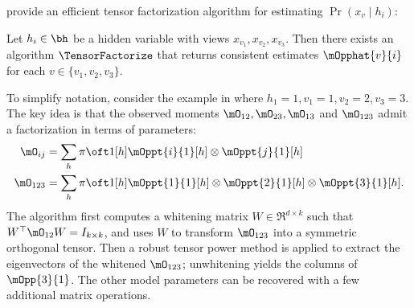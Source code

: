 
%  

\citet{anandkumar12moments} provide an efficient tensor factorization algorithm
for estimating $\Pr(x_v \mid h_i)$:
\begin{theorem}
Let $h_i \in \bh$ be a hidden variable
with views $x_{v_1},x_{v_2},x_{v_3}$.
Then there exists an algorithm $\TensorFactorize$ that
returns consistent estimates $\mOpphat{v}{i}$ for each $v \in \{v_1,v_2,v_3\}$.
\end{theorem}


To simplify notation, consider the example in  where $h_1=1,v_1=1,v_2=2,v_3=3$.
The key idea is that the observed moments $\mO_{12}, \mO_{23}, \mO_{13}$ and
  $\mO_{123}$ admit a factorization in terms of parameters:
\begin{align*}
  \mO_{ij} &= \sum_h {\pi \oft 1}[h] {\mOppt{i}{1}}[h] \otimes {\mOppt{j}{1}}[h] \\ %
  \mO_{123} &= \sum_h {\pi \oft 1}[h] {\mOppt{1}{1}}[h] \otimes {\mOppt{2}{1}}[h] \otimes  {\mOppt{3}{1}}[h].
\end{align*}
The algorithm first computes a whitening matrix $W \in
  \Re^{d \times k}$ such that $W^\top \mO_{12} W = I_{k \times k}$,
  and uses $W$ to transform $\mO_{123}$ into a symmetric orthogonal tensor.  
Then a robust tensor power method is applied to extract the eigenvectors
of the whitened $\mO_{123}$; unwhitening yields the columns of $\mOpp{3}{1}$.
The other model parameters can be recovered with a few additional matrix operations.

